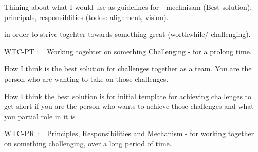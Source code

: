 


Thining about what I would use as guidelines for 
- mechnisam (Best solution), principals, responsiblities (todos: alignment, vision).

in order to strive togehter towards something great (worthwhile/ challenging).


WTC-PT := Working togehter on something Challenging - for a prolong time.  

How I think is the best solution for challenges together as a team. You are the person who are wanting to take on those challenges.

How I think the best solution is for initial template for achieving challenges to get short if you are the person who wants to achieve those challenges and what you partial role in it is 



WTC-PR := Principles, Responsibilities and Mechanism - for working together on something challenging, over a long period of time.




